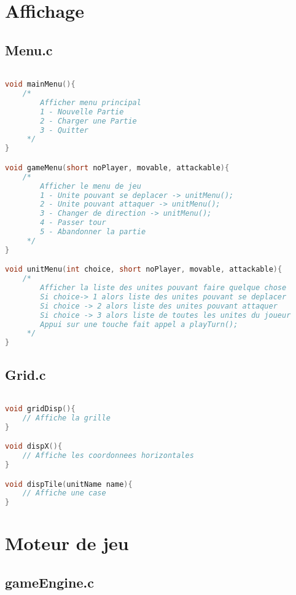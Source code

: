 \documentclass[a4paper,10pt]{extreport}
\begin{document}
\part{Affichage}

\chapter{Menu.c}
\vspace{-1cm}

\begin{lstlisting}[language=c]

void mainMenu(){
	/*
		Afficher menu principal
		1 - Nouvelle Partie
		2 - Charger une Partie
		3 - Quitter
	 */
}

void gameMenu(short noPlayer, movable, attackable){
	/*
		Afficher le menu de jeu
		1 - Unite pouvant se deplacer -> unitMenu();
		2 - Unite pouvant attaquer -> unitMenu();
		3 - Changer de direction -> unitMenu();
		4 - Passer tour
		5 - Abandonner la partie
	 */
}

void unitMenu(int choice, short noPlayer, movable, attackable){
	/*
		Afficher la liste des unites pouvant faire quelque chose
		Si choice-> 1 alors liste des unites pouvant se deplacer
		Si choice -> 2 alors liste des unites pouvant attaquer
		Si choice -> 3 alors liste de toutes les unites du joueur
		Appui sur une touche fait appel a playTurn();
	 */
}
\end{lstlisting}

\chapter{Grid.c}
\vspace{-1cm}

\begin{lstlisting}[language=c]

void gridDisp(){
	// Affiche la grille
}

void dispX(){
	// Affiche les coordonnees horizontales
}

void dispTile(unitName name){
	// Affiche une case
}

\end{lstlisting}

\part{Moteur de jeu}

\chapter{gameEngine.c}
\vspace{-1cm}
\end{document}
